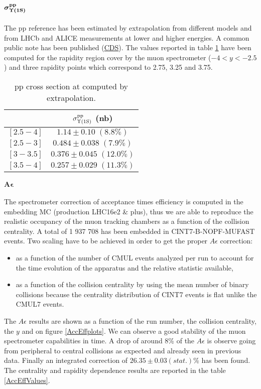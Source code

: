 \paragraph{$\boldsymbol{\sigma^{\rm{pp}}_{\Upsilon\mathrm{(1S)}}}$}
The \ups pp reference has been estimated by extrapolation from different models and from LHCb and ALICE measurements at lower and higher energies.
A common public note has been published (\href{https://cds.cern.ch/record/1748460?ln=fr}{CDS}).
The values reported in table \ref{sigmapp} have been computed for the rapidity region cover by the muon spectrometer ($-4<y<-2.5$) and three rapidity points which correspond to 2.75, 3.25 and 3.75.

\begin{table}[htb]
  \centering
  \begin{tabular} { c | c }
    \hline
    \y & $\sigma^{\rm{pp}}_{\Upsilon\mathrm{(1S)}}$ (nb)  \\\hline
    $[2.5-4]$ & $1.14 \pm 0.10 \;(8.8\%)$ \\
    $[2.5-3]$ & $ 0.484 \pm 0.038 \;(7.9\%) $ \\
    $[3-3.5]$ & $ 0.376 \pm 0.045 \;(12.0\%) $ \\
    $[3.5-4]$ & $ 0.257 \pm 0.029 \;(11.3\%) $ \\\hline
  \end{tabular}
  \caption{\label{sigmapp}\ups pp cross section at \sqrtSE[5.02][TeV] computed by extrapolation.} 
\end{table}


\paragraph{$\boldsymbol{A\epsilon}$}
The spectrometer correction of acceptance times efficiency is computed in the embedding MC (production LHC16e2 \& plus), thus we are able to reproduce the realistic occupancy of the muon tracking chambers as a function of the collision centrality.
A total of  1 937 708 \ups has been embedded in CINT7-B-NOPF-MUFAST events.
Two scaling have to be achieved in order to get the proper $A\epsilon$ correction:
\begin{itemize}
\item as a function of the number of CMUL events analyzed per run to account for the time evolution of the apparatus and the relative statistic available,
\item as a function of the collision centrality by using the mean number of binary collisions because the centrality distribution of CINT7 events is flat unlike the CMUL7 events.
\end{itemize}
The $A\epsilon$ results are shown as a function of the run number, the collision centrality, the \ups $y$ and \pt on figure \ref{AccEffplots}.
We can observe a good stability of the muon spectrometer capabilities in time.
A drop of around 8\% of the $A\epsilon$ is observe going from peripheral to central collisions as expected and already seen in previous data.
Finally an integrated \ups correction of $26.35\pm0.03(stat.)$\% has been found.
The centrality and rapidity dependence results are reported in the table \ref{AccEffValues}.

